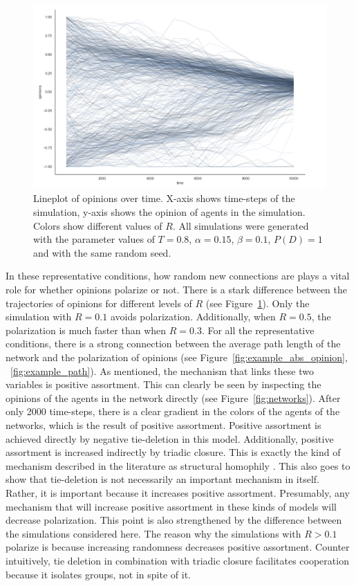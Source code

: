 \documentclass[11pt]{article}
\begin{document}
\begin{figure}[H]
    \centering
    \includegraphics[width=.8\linewidth]{../plots/example/Lineplot_Over_Time.png}
  \caption{Lineplot of opinions over time. X-axis shows time-steps of the simulation, y-axis shows the opinion of agents in the simulation. Colors show different values of $R$. All simulations were generated with the parameter values of $T = 0.8$, $\alpha = 0.15$, $\beta = 0.1$, $P(D) = 1$ and with the same random seed.}
  \label{fig:lineplot}
\end{figure}

\noindent In these representative conditions, how random new connections are plays a vital role for whether opinions polarize or not. There is a stark difference between the trajectories of opinions for different levels of $R$ (see Figure~\ref{fig:lineplot}). Only the simulation with $R=0.1$ avoids polarization. Additionally, when $R=0.5$, the polarization is much faster than when $R=0.3$. For all the representative conditions, there is a strong connection between the average path length of the network and the polarization of opinions (see Figure~\ref{fig:example_abs_opinion}, ~\ref{fig:example_path}). As mentioned, the mechanism that links these two variables is positive assortment. This can clearly be seen by inspecting the opinions of the agents in the network directly (see Figure~\ref{fig:networks}). After only 2000 time-steps, there is a clear gradient in the colors of the agents of the networks, which is the result of positive assortment. Positive assortment is achieved directly by negative tie-deletion in this model. Additionally, positive assortment is increased indirectly by triadic closure. This is exactly the kind of mechanism described in the literature as structural homophily \cite{asikainen_cumulative_2020,peixoto_disentangling_2022}. This also goes to show that tie-deletion is not necessarily an important mechanism in itself. Rather, it is important because it increases positive assortment. Presumably, any mechanism that will increase positive assortment in these kinds of models will decrease polarization. This point is also strengthened by the difference between the simulations considered here. The reason why the simulations with $R > 0.1$ polarize is because increasing randomness decreases positive assortment. Counter intuitively, tie deletion in combination with triadic closure facilitates cooperation because it isolates groups, not in spite of it. 
\end{document}
